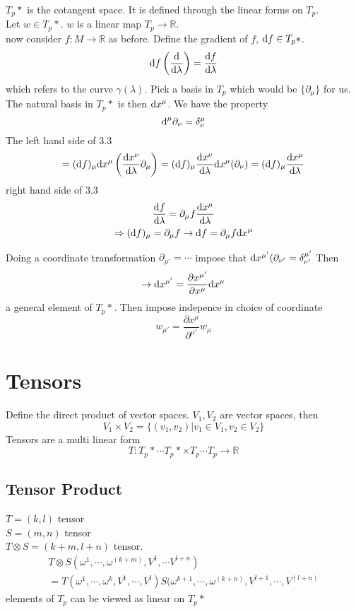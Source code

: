 $T_p*$ is the cotangent space. It is defined through the linear forms on $T_p$.\\
Let $w\in T_p*$. $w$ is a linear map $T_p\rightarrow \mathbb R$.\\
now consider $f:M\rightarrow \mathbb R$ as before. Define the gradient of $f$, $\text df\in T_p*$.
\begin{equation}
\text df \left(\frac{\text d}{\text d\lambda}\right) = \frac{\text df}{\text d\lambda}
\end{equation}
which refers to the curve $\gamma(\lambda)$. Pick a basis in $T_p$ which would be $\{\partial_\mu\}$ for us. The natural basis in $T_p*$ is then $\text dx^\mu$. We have the property
$$
\text d^\mu \partial_\nu = \delta^\mu_\nu
$$
The left hand side of 3.3
\begin{gather}
	= (\text df)_\mu \text dx^\mu \left( \frac{\text dx^\nu}{\text d\lambda}\partial_\mu\right) = (\text df)_\mu \frac{\text dx^\nu}{\text d\lambda}\text dx^\mu (\partial_\nu) = (\text df)_\mu \frac{\text dx^\mu}{\text d\lambda}
\end{gather}
right hand side of 3.3
\begin{gather}
	\frac{\text df}{\text d\lambda} = \partial_\mu f \frac{\text dx^\mu}{\text d\lambda}\\
	\Rightarrow (\text df)_\mu = \partial_\mu f \rightarrow \text df = \partial_\mu f\text dx^\mu
\end{gather}

Doing a coordinate transformation $\partial_{\mu'} = \cdots$ impose that $\text dx^{\mu'}(\partial_{\nu'} = \delta^{\mu'}_{\nu'}$ Then
$$
\rightarrow \text dx^{\mu'} = \frac{\partial x^{\mu'}}{\partial x^\mu}\text dx^\mu
$$
a general element of $T_p*$. Then impose indepence in choice of coordinate
\begin{equation}
	w_{\mu'} = \frac{\partial x^\mu}{\partial^{\mu'}}w_\mu
\end{equation}

\section{Tensors}
Define the direct product of vector spaces. $V_1, V_2$ are vector spaces, then
$$
V_1 \times V_2 = \{(v_1,v_2)|v_1\in V_1, v_2\in V_2\}
$$
Tensors are a multi linear form
$$
T: T_p*\cdots T_p*\times T_p\cdots T_p \rightarrow \mathbb R
$$

\subsection{Tensor Product}
$T = (k,l)$ tensor\\
$S = (m,n)$ tensor\\
$T\otimes S = (k+m, l+n)$ tensor.\\
\begin{gather}
T\otimes S (\omega^1, \cdots, \omega^{(k+m)}, V^1,\cdots V^{l+n})\\
= T(\omega^1,\cdots,\omega^k, V^1,\cdots, V^l)S(\omega^{k+1},\cdots,\omega^{(k+n)}, V^{l+1},\cdots, V^{(l+n)}
\end{gather}
elements of $T_p$ can be viewed as linear on $T_p*$




